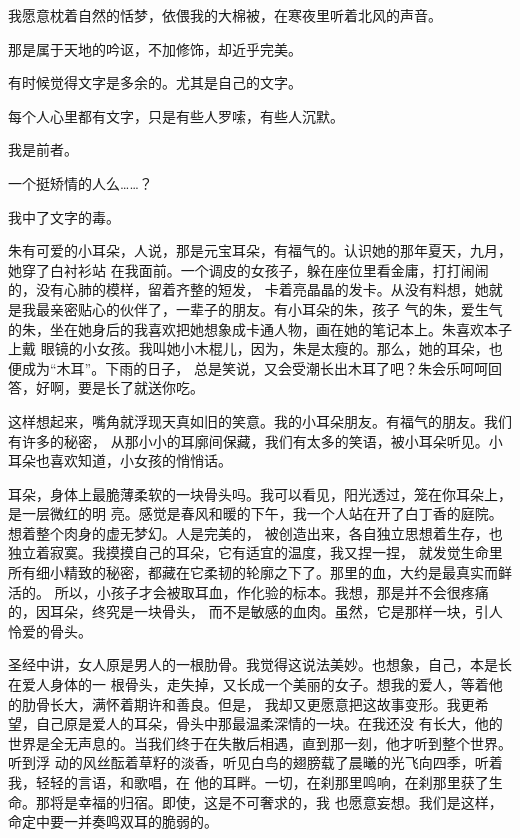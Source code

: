 		我愿意枕着自然的恬梦，依偎我的大棉被，在寒夜里听着北风的声音。

		那是属于天地的吟讴，不加修饰，却近乎完美。


		有时候觉得文字是多余的。尤其是自己的文字。

		每个人心里都有文字，只是有些人罗嗦，有些人沉默。

		我是前者。

		一个挺矫情的人么……？

		我中了文字的毒。

	\endwriting



		朱有可爱的小耳朵，人说，那是元宝耳朵，有福气的。认识她的那年夏天，九月，她穿了白衬衫站
	在我面前。一个调皮的女孩子，躲在座位里看金庸，打打闹闹的，没有心肺的模样，留着齐整的短发，
	卡着亮晶晶的发卡。从没有料想，她就是我最亲密贴心的伙伴了，一辈子的朋友。有小耳朵的朱，孩子
	气的朱，爱生气的朱，坐在她身后的我喜欢把她想象成卡通人物，画在她的笔记本上。朱喜欢本子上戴
	眼镜的小女孩。我叫她小木棍儿，因为，朱是太瘦的。那么，她的耳朵，也便成为“木耳”。下雨的日子，
	总是笑说，又会受潮长出木耳了吧？朱会乐呵呵回答，好啊，要是长了就送你吃。


		这样想起来，嘴角就浮现天真如旧的笑意。我的小耳朵朋友。有福气的朋友。我们有许多的秘密，
	从那小小的耳廓间保藏，我们有太多的笑语，被小耳朵听见。小耳朵也喜欢知道，小女孩的悄悄话。


		耳朵，身体上最脆薄柔软的一块骨头吗。我可以看见，阳光透过，笼在你耳朵上，是一层微红的明
	亮。感觉是春风和暖的下午，我一个人站在开了白丁香的庭院。想着整个肉身的虚无梦幻。人是完美的，
	被创造出来，各自独立思想着生存，也独立着寂寞。我摸摸自己的耳朵，它有适宜的温度，我又捏一捏，
	就发觉生命里所有细小精致的秘密，都藏在它柔韧的轮廓之下了。那里的血，大约是最真实而鲜活的。
	所以，小孩子才会被取耳血，作化验的标本。我想，那是并不会很疼痛的，因耳朵，终究是一块骨头，
	而不是敏感的血肉。虽然，它是那样一块，引人怜爱的骨头。


		圣经中讲，女人原是男人的一根肋骨。我觉得这说法美妙。也想象，自己，本是长在爱人身体的一
	根骨头，走失掉，又长成一个美丽的女子。想我的爱人，等着他的肋骨长大，满怀着期许和善良。但是，
	我却又更愿意把这故事变形。我更希望，自己原是爱人的耳朵，骨头中那最温柔深情的一块。在我还没
	有长大，他的世界是全无声息的。当我们终于在失散后相遇，直到那一刻，他才听到整个世界。听到浮
	动的风丝酝着草籽的淡香，听见白鸟的翅膀载了晨曦的光飞向四季，听着我，轻轻的言语，和歌唱，在
	他的耳畔。一切，在刹那里鸣响，在刹那里获了生命。那将是幸福的归宿。即使，这是不可奢求的，我
	也愿意妄想。我们是这样，命定中要一并奏鸣双耳的脆弱的。


